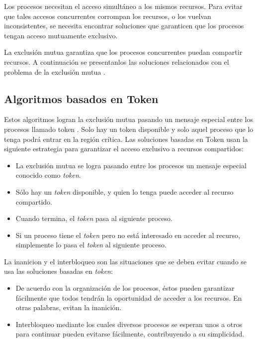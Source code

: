 	Los procesos necesitan el acceso simultáneo a los mismos recursos. Para  evitar que tales accesos concurrentes corrompan los recursos, o los vuelvan inconsistentes, se necesita encontrar soluciones que garanticen que los	procesos tengan acceso mutuamente exclusivo.
   
   La exclusión mutua garantiza que los procesos concurrentes   puedan compartir recursos. A continuaci\'on  se presentanlos las soluciones  relacionados con el problema de la exclusión mutua  .
 
\subsection{Algoritmos basados en Token}

Estos algoritmos logran la exclusión mutua pasando un mensaje especial entre los procesos llamado token . Solo hay un token disponible y solo aquel proceso que lo tenga podrá entrar en la región crítica.
 Las soluciones basadas en Token usan la siguiente estrategia para garantizar el acceso exclusivo a recursos compartidos:
	\begin{itemize} 
		\item La exclusión mutua se logra pasando entre los procesos un mensaje especial conocido como \textit{token}. 
		\item Sólo hay un \textit{token} disponible, y quien lo tenga puede acceder al recurso compartido.
		\item  Cuando termina, el \textit{token} pasa al siguiente proceso. 
		\item Si un proceso 	tiene el \textit{token} pero no está interesado en acceder al recurso, simplemente lo pasa el \textit{token} al siguiente proceso.
		
	\end{itemize}
 
 
 La \gls{inanicion} y el \gls{interbloqueo} son las situaciones que se deben  evitar cuando se usa  las soluciones basadas en \textit{token}:
	\begin{itemize} 
		\item De acuerdo con la organización de los procesos, éstos pueden garantizar fácilmente que todos tendrán la oportunidad de acceder a los recursos. En otras palabras, evitan la inanición.
		\item  Interbloqueo mediante los cuales diversos procesos se esperan unos a otros para continuar pueden evitarse fácilmente, 	contribuyendo a su simplicidad. 
		
	\end{itemize}
 
